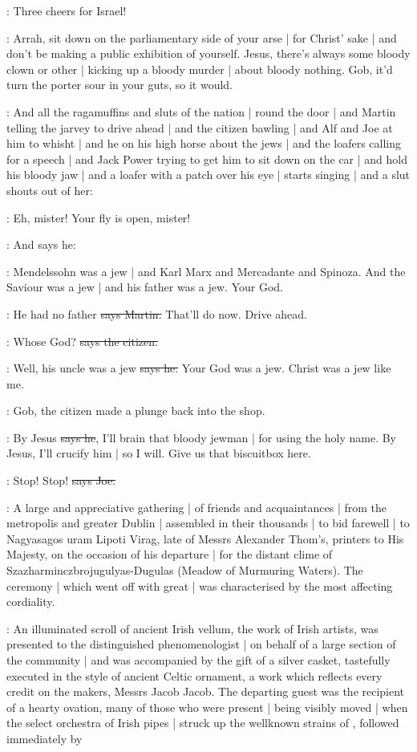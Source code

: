 \citizen:
Three cheers for Israel!

\Nq:
Arrah,
sit down on the parliamentary side of your arse |
for Christ' sake |
and don't be making a public exhibition of yourself.
Jesus,
there's always some bloody clown or other |
kicking up a bloody murder |
about bloody nothing.
Gob,
it'd turn the porter sour in your guts,
so it would.

\Nq:
And all the ragamuffins and sluts of the nation |
round the door |
and Martin telling the jarvey to drive ahead |
and the citizen bawling |
and Alf and Joe at him to whisht |
and he on his high horse about the jews |
and the loafers calling for a speech |
and Jack Power trying to get him to sit down on the car |
and hold his bloody jaw |
and a loafer with a patch over his eye |
starts singing  |
and a slut shouts out of her:

\ragamuffin:
Eh,
mister!
Your fly is open,
mister!

\Nq:
And says he:

\Bloom:
Mendelssohn was a jew |
and Karl Marx and Mercadante and Spinoza.
And the Saviour was a jew |
and his father was a jew.
Your God.

\cunningham:
He had no father
\sout{says Martin.}
That'll do now.
Drive ahead.

\citizen:
Whose God?
\sout{says the citizen.}

\Bloom:
Well,
his uncle was a jew
\sout{says he.}
Your God was a jew.
Christ was a jew like me.

\Nq:
Gob,
the citizen made a plunge back into the shop.

\citizen:
By Jesus
\sout{says he},
I'll brain that bloody jewman |
for using the holy name.
By Jesus,
I'll crucify him |
so I will.
Give us that biscuitbox here.

\joe:
Stop!
Stop!
\sout{says Joe.}

:
A large and appreciative gathering |
of friends and acquaintances |
from the metropolis and greater Dublin |
assembled in their thousands |
to bid farewell |
to Nagyasagos uram Lipoti Virag,
late of Messrs Alexander Thom's,
printers to His Majesty,
on the occasion of his departure |
for the distant clime of Szazharminczbrojugulyas-Dugulas
(Meadow of Murmuring Waters).
The ceremony |
which went off with great  |
was characterised by the most affecting cordiality.%

:
An illuminated scroll of ancient Irish vellum,
the work of Irish artists,
was presented to the distinguished phenomenologist |
on behalf of a large section of the community |
and was accompanied by the gift of a silver casket,
tastefully executed in the style of ancient Celtic ornament,
a work which reflects every credit on the makers,
Messrs Jacob  Jacob.
The departing guest was the recipient of a hearty ovation,
many of those who were present |
being visibly moved |
when the select orchestra of Irish pipes |
struck up the wellknown strains of ,
followed immediately by 

